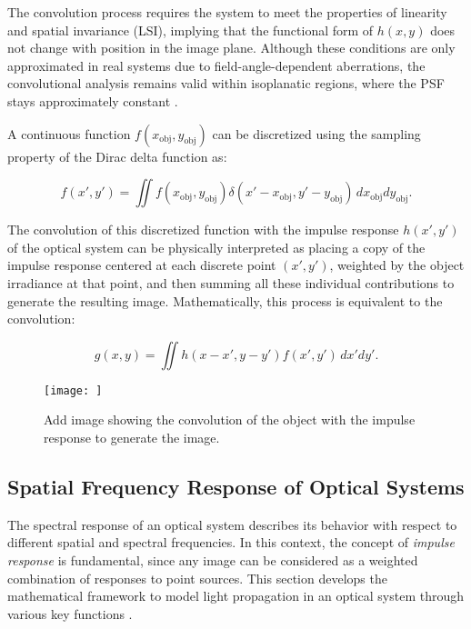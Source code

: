 The convolution process requires the system to meet the properties of linearity and spatial invariance (LSI), implying that the functional form of \( h(x,y) \) does not change with position in the image plane. Although these conditions are only approximated in real systems due to field-angle-dependent aberrations, the convolutional analysis remains valid within isoplanatic regions, where the PSF stays approximately constant \cite{Boreman2001ModulationTT52}.

A continuous function \( f(x_{\text{obj}},y_{\text{obj}}) \) can be discretized using the sampling property of the Dirac delta function as:

\begin{equation}
f(x',y') = \iint f(x_{\text{obj}},y_{\text{obj}}) \delta(x'-x_{\text{obj}}, y'-y_{\text{obj}})\,dx_{\text{obj}}dy_{\text{obj}}.
\end{equation}

The convolution of this discretized function with the impulse response \( h(x',y') \) of the optical system can be physically interpreted as placing a copy of the impulse response centered at each discrete point \((x', y')\), weighted by the object irradiance at that point, and then summing all these individual contributions to generate the resulting image. Mathematically, this process is equivalent to the convolution:

\begin{equation}
g(x,y) = \iint h(x-x', y-y') f(x',y')\, dx'dy'.
\end{equation}

\begin{figure}
    \centering
    \texttt{[image: ]}
    \caption{Add image showing the convolution of the object with the impulse response to generate the image.}
    \label{fig:enter-label}
\end{figure}

\subsection{Spatial Frequency Response of Optical Systems}

The spectral response of an optical system describes its behavior with respect to different spatial and spectral frequencies. In this context, the concept of \textit{impulse response} is fundamental, since any image can be considered as a weighted combination of responses to point sources. This section develops the mathematical framework to model light propagation in an optical system through various key functions \cite{Boreman2001ModulationTT52}.

